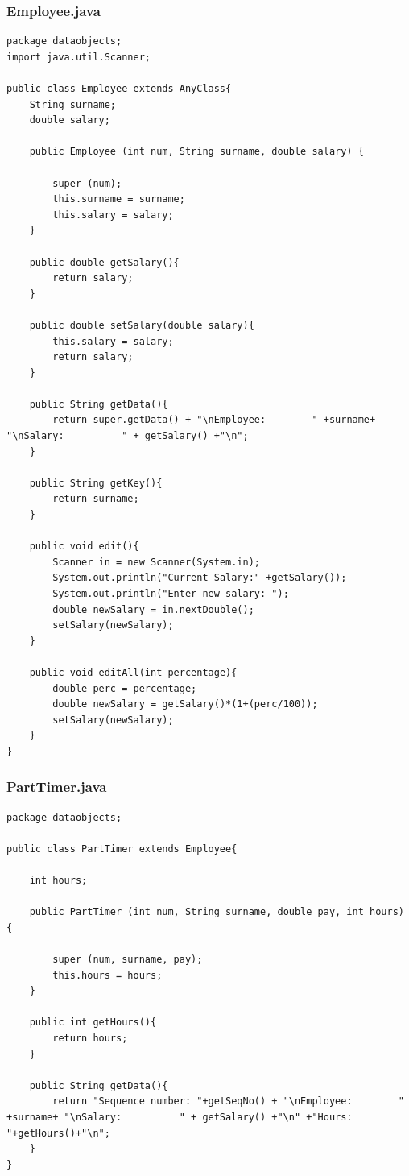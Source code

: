 \documentclass[12pt]{article}
\begin{document}
\subsubsection{Employee.java}
\begin{lstlisting}
package dataobjects;
import java.util.Scanner;

public class Employee extends AnyClass{
    String surname;
    double salary;

    public Employee (int num, String surname, double salary) {
        
        super (num);
        this.surname = surname;
        this.salary = salary;        
    }

    public double getSalary(){
        return salary;
    }

    public double setSalary(double salary){
        this.salary = salary;
        return salary;
    }

    public String getData(){
        return super.getData() + "\nEmployee:        " +surname+ "\nSalary:          " + getSalary() +"\n";
    }

    public String getKey(){
        return surname;
    }

    public void edit(){
        Scanner in = new Scanner(System.in);
        System.out.println("Current Salary:" +getSalary());
        System.out.println("Enter new salary: ");
        double newSalary = in.nextDouble();   
        setSalary(newSalary);    
    }

    public void editAll(int percentage){
        double perc = percentage;
        double newSalary = getSalary()*(1+(perc/100));
        setSalary(newSalary);
    }
}

\end{lstlisting}

\subsubsection{PartTimer.java}
\begin{lstlisting}
package dataobjects;

public class PartTimer extends Employee{

    int hours;

    public PartTimer (int num, String surname, double pay, int hours) {
        
        super (num, surname, pay);
        this.hours = hours;      
    }

    public int getHours(){
        return hours;
    }

    public String getData(){
        return "Sequence number: "+getSeqNo() + "\nEmployee:        " +surname+ "\nSalary:          " + getSalary() +"\n" +"Hours:           "+getHours()+"\n";
    }
}

\end{lstlisting}
\end{document}
